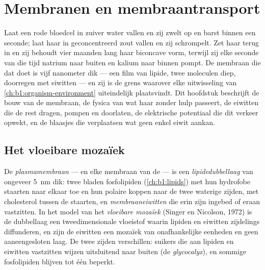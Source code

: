 \chapter{Membranen en membraantransport}\label{ch:b1:membranes-transport}

Laat een rode bloedcel in zuiver water vallen en zij zwelt op en barst binnen een
seconde; laat haar in geconcentreerd zout vallen en zij schrompelt. Zet haar
terug in  en zij behoudt vier maanden lang haar biconcave vorm, terwijl zij
elke seconde van die tijd natrium naar buiten en kalium naar binnen pompt. De
membraan die dat doet is vijf nanometer dik --- een film van lipide, twee
moleculen diep, doorregen met eiwitten --- en zij is de grens waarover elke
uitwisseling van \cref{ch:b1:organism-environment} uiteindelijk plaatsvindt. Dit
hoofdstuk beschrijft de bouw van de membraan, de fysica van wat haar zonder hulp
passeert, de eiwitten die de rest dragen, pompen en doorlaten, de elektrische
potentiaal die dit verkeer opwekt, en de blaasjes die verplaatsen wat geen enkel
eiwit aankan.

\section{Het vloeibare mozaïek}

\begin{definition}[De plasmamembraan]\label{def:b1:membranes-transport:membrane}
De \emph{plasmamembraan} --- en elke membraan van de 
--- is een \emph{lipidedubbellaag} van ongeveer
\qty{5}{nm} dik: twee bladen fosfolipiden (\cref{ch:b1:lipids}) met hun hydrofobe
staarten naar elkaar toe en hun polaire koppen naar de twee waterige zijden, met
cholesterol tussen de staarten, en
\emph{membraaneiwitten} die erin zijn ingebed of eraan
vastzitten. In het model van het \emph{vloeibare mozaïek}
(Singer en Nicolson, 1972) is de dubbellaag een tweedimensionale vloeistof waarin
lipiden en eiwitten zijdelings diffunderen, en zijn de eiwitten een mozaïek van
onafhankelijke eenheden en geen aaneengesloten laag. De twee zijden verschillen:
suikers die aan lipiden en eiwitten vastzitten wijzen uitsluitend naar buiten
(de \emph{glycocalyx}), en sommige fosfolipiden blijven tot één  beperkt.
\end{definition}


